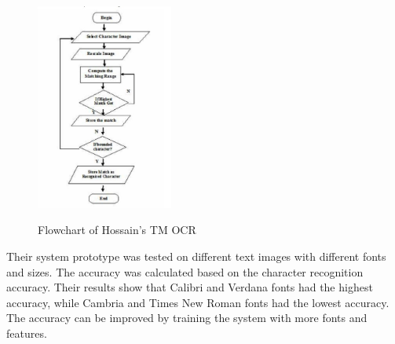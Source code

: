 \begin{figure}[ht]
    \centering
    \includegraphics[width=0.4\textwidth]{Figures/TM_Hossain.jpg}
    \caption[Flowchart of Template Matching OCR]{Flowchart of Hossain's TM OCR}\cite{hossainOpticalCharacterRecognition2019}
    \label{fig:Hossain OCR Template Matching Paper}
\end{figure}

Their system prototype was tested on different text images with different fonts and sizes. The accuracy was calculated based on the character recognition accuracy. Their results show that Calibri and Verdana fonts had the highest accuracy, while Cambria and Times New Roman fonts had the lowest accuracy.  The accuracy can be improved by training the system with more fonts and features. \cite{hossainOpticalCharacterRecognition2019}


